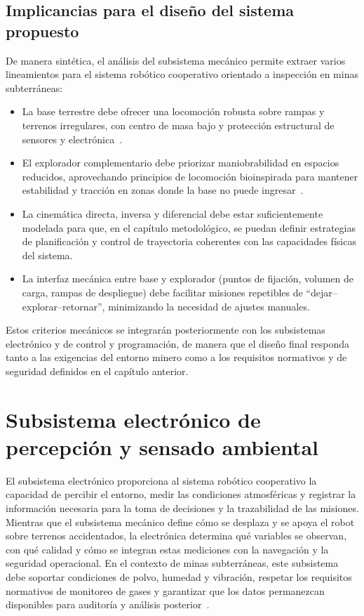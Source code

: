 \subsection{Implicancias para el diseño del sistema propuesto}

\hspace{1.25cm}
De manera sintética, el análisis del subsistema mecánico permite extraer varios lineamientos para el sistema robótico cooperativo orientado a inspección en minas subterráneas:

\begin{itemize}
    \item La base terrestre debe ofrecer una locomoción robusta sobre rampas y terrenos irregulares, con centro de masa bajo y protección estructural de sensores y electrónica~\cite{AdvancesMining_2023}.
    \item El explorador complementario debe priorizar maniobrabilidad en espacios reducidos, aprovechando principios de locomoción bioinspirada para mantener estabilidad y tracción en zonas donde la base no puede ingresar~\cite{InsectInspired_2020,James2021_InsectLegDesign}.
    \item La cinemática directa, inversa y diferencial debe estar suficientemente modelada para que, en el capítulo metodológico, se puedan definir estrategias de planificación y control de trayectoria coherentes con las capacidades físicas del sistema.
    \item La interfaz mecánica entre base y explorador (puntos de fijación, volumen de carga, rampas de despliegue) debe facilitar misiones repetibles de ``dejar--explorar--retornar'', minimizando la necesidad de ajustes manuales.
\end{itemize}

Estos criterios mecánicos se integrarán posteriormente con los subsistemas electrónico y de control y programación, de manera que el diseño final responda tanto a las exigencias del entorno minero como a los requisitos normativos y de seguridad definidos en el capítulo anterior.

\section{Subsistema electrónico de percepción y sensado ambiental}
\label{sec:subsistema_electronico}

\hspace{1.25cm}
El subsistema electrónico proporciona al sistema robótico cooperativo la capacidad de percibir el entorno, medir las condiciones atmosféricas y registrar la información necesaria para la toma de decisiones y la trazabilidad de las misiones. Mientras que el subsistema mecánico define cómo se desplaza y se apoya el robot sobre terrenos accidentados, la electrónica determina qué variables se observan, con qué calidad y cómo se integran estas mediciones con la navegación y la seguridad operacional. En el contexto de minas subterráneas, este subsistema debe soportar condiciones de polvo, humedad y vibración, respetar los requisitos normativos de monitoreo de gases y garantizar que los datos permanezcan disponibles para auditoría y análisis posterior~\cite{MINEM_DS024_2016,OSINERGMIN_BoletinGSM_2020b,EmisionesDiesel_2021}.

